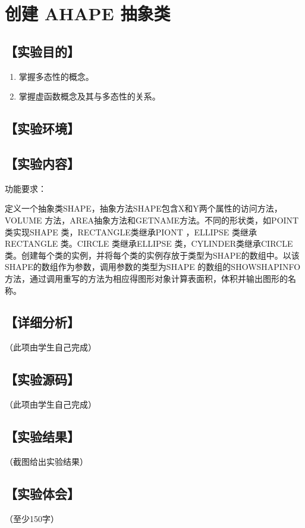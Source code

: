 \section{创建 AHAPE 抽象类}
\hfill{}
\subsection*{【实验目的】}
\begin{enumerate}[topsep=0pt,partopsep=0pt,itemsep=0pt,parsep=0pt,label={\arabic*、}]
\item 掌握多态性的概念。
\item 掌握虚函数概念及其与多态性的关系。
\end{enumerate}
\subsection*{【实验环境】}
\MyEnvironment
\subsection*{【实验内容】}
功能要求：

定义一个抽象类SHAPE，抽象方法SHAPE包含X和Y两个属性的访问方法，VOLUME 方法，AREA抽象方法和GETNAME方法。不同的形状类，如POINT 类实现SHAPE 类，RECTANGLE类继承PIONT ，ELLIPSE 类继承RECTANGLE 类。CIRCLE 类继承ELLIPSE 类，CYLINDER类继承CIRCLE类。创建每个类的实例，并将每个类的实例存放于类型为SHAPE的数组中。以该SHAPE的数组作为参数，调用参数的类型为SHAPE 的数组的SHOWSHAPINFO方法，通过调用重写的方法为相应得图形对象计算表面积，体积并输出图形的名称。
\subsection*{【详细分析】}
（此项由学生自己完成）
\subsection*{【实验源码】}
（此项由学生自己完成）
\subsection*{【实验结果】}
（截图给出实验结果）
\subsection*{【实验体会】}
（至少150字）

